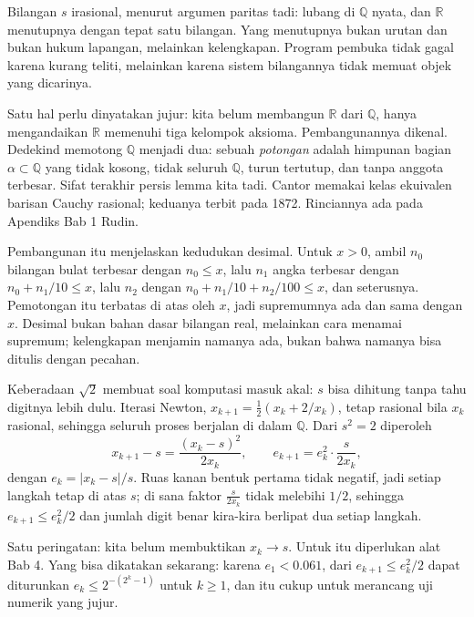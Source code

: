 Bilangan $s$ irasional, menurut argumen paritas tadi: lubang di $\mathbb{Q}$ nyata, dan
$\mathbb{R}$ menutupnya dengan tepat satu bilangan. Yang menutupnya bukan urutan dan
bukan hukum lapangan, melainkan kelengkapan. Program pembuka tidak gagal karena kurang
teliti, melainkan karena sistem bilangannya tidak memuat objek yang dicarinya.

Satu hal perlu dinyatakan jujur: kita belum membangun $\mathbb{R}$ dari $\mathbb{Q}$,
hanya mengandaikan $\mathbb{R}$ memenuhi tiga kelompok aksioma. Pembangunannya dikenal.
Dedekind memotong $\mathbb{Q}$ menjadi dua: sebuah \emph{potongan} adalah himpunan
bagian $\alpha\subset\mathbb{Q}$ yang tidak kosong, tidak seluruh $\mathbb{Q}$, turun
tertutup, dan tanpa anggota terbesar. Sifat terakhir persis lemma kita tadi. Cantor
memakai kelas ekuivalen barisan Cauchy rasional; keduanya terbit pada 1872. Rinciannya
ada pada Apendiks Bab 1 Rudin.

Pembangunan itu menjelaskan kedudukan desimal. Untuk $x>0$, ambil $n_0$ bilangan bulat
terbesar dengan $n_0\le x$, lalu $n_1$ angka terbesar dengan $n_0+n_1/10\le x$, lalu
$n_2$ dengan $n_0+n_1/10+n_2/100\le x$, dan seterusnya. Pemotongan itu terbatas di atas
oleh $x$, jadi supremumnya ada dan sama dengan $x$. Desimal bukan bahan dasar bilangan
real, melainkan cara menamai supremum; kelengkapan menjamin namanya ada, bukan bahwa
namanya bisa ditulis dengan pecahan.


Keberadaan $\sqrt2$ membuat soal komputasi masuk akal: $s$ bisa dihitung tanpa tahu
digitnya lebih dulu. Iterasi Newton, $x_{k+1}=\frac12(x_k+2/x_k)$, tetap rasional bila
$x_k$ rasional, sehingga seluruh proses berjalan di dalam $\mathbb{Q}$. Dari $s^2=2$
diperoleh
\[
x_{k+1}-s=\frac{(x_k-s)^2}{2x_k},\qquad e_{k+1}=e_k^2\cdot\frac{s}{2x_k},
\]
dengan $e_k=|x_k-s|/s$. Ruas kanan bentuk pertama tidak negatif, jadi setiap langkah
tetap di atas $s$; di sana faktor $\frac{s}{2x_k}$ tidak melebihi $1/2$, sehingga
$e_{k+1}\le e_k^2/2$ dan jumlah digit benar kira-kira berlipat dua setiap langkah.

Satu peringatan: kita belum membuktikan $x_k\to s$. Untuk itu diperlukan alat Bab 4.
Yang bisa dikatakan sekarang: karena $e_1<0.061$, dari $e_{k+1}\le e_k^2/2$ dapat
diturunkan $e_k\le 2^{-(2^k-1)}$ untuk $k\ge 1$, dan itu cukup untuk merancang uji
numerik yang jujur.

